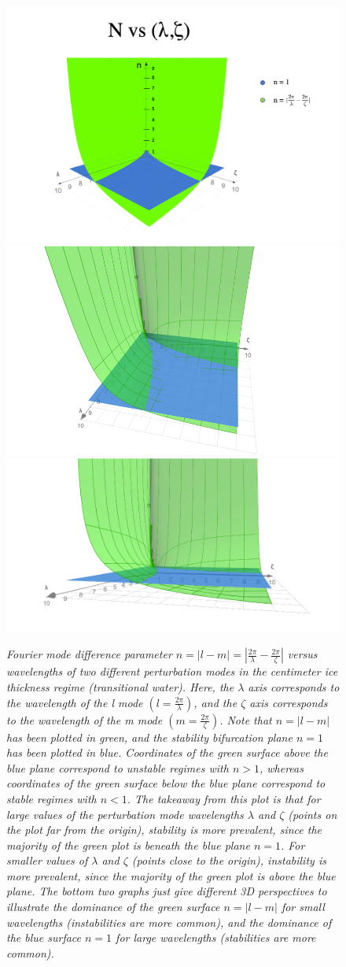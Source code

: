 \documentclass{article}
\begin{document}
\begin{figure}
    \centering
    \includegraphics[width=.7\textwidth]{specialn.png}\vfill
    \includegraphics[width=.45\textwidth]{version2.png}
    \includegraphics[width=.5\textwidth]{version3.png}\hfill
    \caption{\emph{Fourier mode difference parameter \(n = |l - m| = |\frac{2 \pi}{\lambda} - \frac{2 \pi}{\zeta}|\) versus wavelengths of two different perturbation modes in the centimeter ice thickness regime (transitional water). Here, the \(\lambda\) axis corresponds to the wavelength of the l mode \((l = \frac{2\pi}{\lambda})\), and the \(\zeta\) axis corresponds to the wavelength of the m mode \((m = \frac{2\pi}{\zeta})\). Note that \(n = |l-m|\) has been plotted in green, and the stability bifurcation plane \(n = 1\) has been plotted in blue. Coordinates of the green surface above the blue plane correspond to unstable regimes with \(n>1\), whereas coordinates of the green surface below the blue plane correspond to stable regimes with \(n<1\). The takeaway from this plot is that for large values of the perturbation mode wavelengths \(\lambda\) and \(\zeta\) (points on the plot far from the origin), stability is more prevalent, since the majority of the green plot is beneath the blue plane \(n=1\). For smaller values of \(\lambda\) and \(\zeta\) (points close to the origin), instability is more prevalent, since the majority of the green plot is above the blue plane. The bottom two graphs just give different 3D perspectives to illustrate the dominance of the green surface \(n = |l-m|\) for small wavelengths (instabilities are more common), and the dominance of the blue surface \(n = 1\) for large wavelengths (stabilities are more common).}}
    \label{specialn}
\end{figure}
\end{document}
